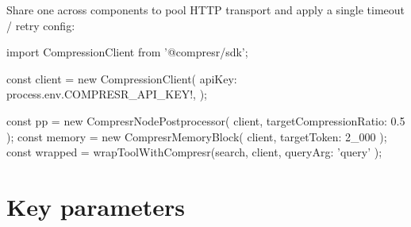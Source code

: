 \documentclass[10pt]{article}
\begin{document}
Share one  across components to pool
HTTP transport and apply a single timeout / retry config:

\begin{tscode}
import { CompressionClient } from '@compresr/sdk';

const client = new CompressionClient({
  apiKey: process.env.COMPRESR_API_KEY!,
});

const pp      = new CompresrNodePostprocessor({ client, targetCompressionRatio: 0.5 });
const memory  = new CompresrMemoryBlock({ client, targetToken: 2_000 });
const wrapped = wrapToolWithCompresr(search, { client, queryArg: 'query' });
\end{tscode}

\section{Key parameters}

\renewcommand{\arraystretch}{1.2}
\end{document}

